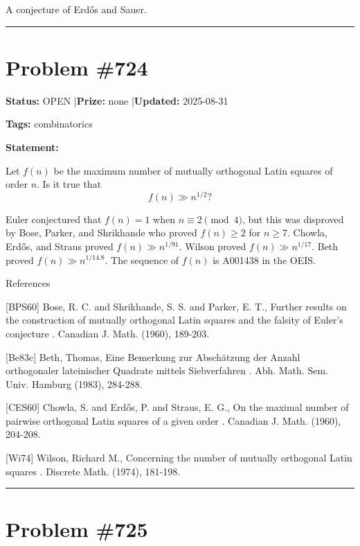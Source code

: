 \documentclass{article}
\begin{document}
A conjecture of Erd\H{o}s and Sauer.

\noindent\rule{\linewidth}{0.4pt}


\section{Problem \#724}
\label{prob:724}

\noindent\textbf{Status:} OPEN \quad|\quad \textbf{Prize:} none \quad|\quad \textbf{Updated:} 2025-08-31

\noindent\textbf{Tags:} combinatorics

\medskip

\noindent\textbf{Statement:}

Let $f(n)$ be the maximum number of mutually orthogonal Latin squares of order $n$. Is it true that\[f(n) \gg n^{1/2}?\]




Euler conjectured that $f(n)=1$ when $n\equiv 2\pmod{4}$, but this was disproved by Bose, Parker, and Shrikhande \cite{BPS60} who proved $f(n)\geq 2$ for $n\geq 7$. Chowla, Erd\H{o}s, and Straus \cite{CES60} proved $f(n) \gg n^{1/91}$. Wilson \cite{Wi74} proved $f(n) \gg n^{1/17}$. Beth \cite{Be83c} proved $f(n) \gg n^{1/14.8}$. The sequence of $f(n)$ is A001438 in the OEIS.




References

[BPS60] Bose, R. C. and Shrikhande, S. S. and Parker, E. T., Further results on the construction of mutually orthogonal Latin squares and the falsity of Euler's conjecture . Canadian J. Math. (1960), 189-203.

[Be83c] Beth, Thomas, Eine Bemerkung zur Absch\"{a}tzung der Anzahl orthogonaler lateinischer Quadrate mittels Siebverfahren . Abh. Math. Sem. Univ. Hamburg (1983), 284-288.

[CES60] Chowla, S. and Erd\H{o}s, P. and Straus, E. G., On the maximal number of pairwise orthogonal Latin squares of a given order . Canadian J. Math. (1960), 204-208.

[Wi74] Wilson, Richard M., Concerning the number of mutually orthogonal Latin squares . Discrete Math. (1974), 181-198.

\noindent\rule{\linewidth}{0.4pt}


\section{Problem \#725}
\label{prob:725}
\end{document}
